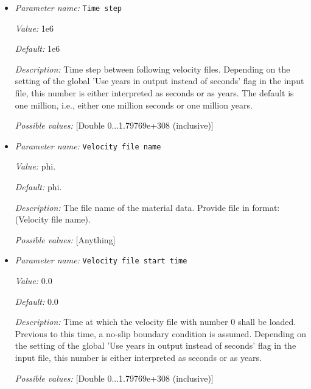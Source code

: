 \begin{itemize}
{\it Value:} 1.570796,1.570796


{\it Default:} 1.570796,1.570796


{\it Description:} Point that determines the plane in which a 2D model lies in. Has to be in the format 'a,b' where a and b are theta (polar angle)  and phi in radians.


{\it Possible values:} [Anything]
\item {\it Parameter name:} {\tt Time step}


{\it Value:} 1e6


{\it Default:} 1e6


{\it Description:} Time step between following velocity files. Depending on the setting of the global 'Use years in output instead of seconds' flag in the input file, this number is either interpreted as seconds or as years. The default is one million, i.e., either one million seconds or one million years.


{\it Possible values:} [Double 0...1.79769e+308 (inclusive)]
\item {\it Parameter name:} {\tt Velocity file name}


{\it Value:} phi.%


{\it Default:} phi.%


{\it Description:} The file name of the material data. Provide file in format: (Velocity file name).%


{\it Possible values:} [Anything]
\item {\it Parameter name:} {\tt Velocity file start time}


{\it Value:} 0.0


{\it Default:} 0.0


{\it Description:} Time at which the velocity file with number 0 shall be loaded. Previous to this time, a no-slip boundary condition is assumed. Depending on the setting of the global 'Use years in output instead of seconds' flag in the input file, this number is either interpreted as seconds or as years.


{\it Possible values:} [Double 0...1.79769e+308 (inclusive)]
\end{itemize}


